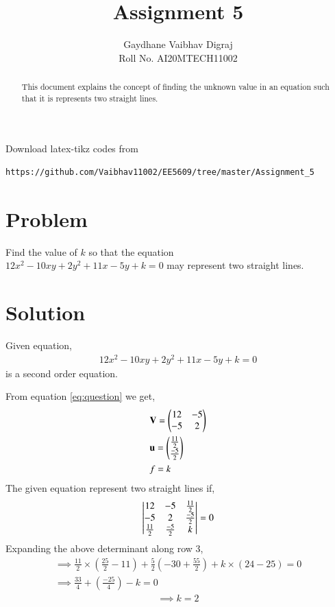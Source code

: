 \documentclass[journal,12pt,twocolumn]{IEEEtran}
\begin{document}
     \def\rightbox#1{\makebox[0in][r]{#1}}
     \def\centbox#1{\makebox[0in]{#1}}
     \def\topbox#1{\raisebox{-\baselineskip}[0in][0in]{#1}}
     \def\midbox#1{\raisebox{-0.5\baselineskip}[0in][0in]{#1}}
\vspace{3cm}
\title{Assignment 5}
\author{Gaydhane Vaibhav Digraj \\ Roll No. AI20MTECH11002}
\maketitle
\newpage
\bigskip
\renewcommand{\thefigure}{\theenumi}
\renewcommand{\thetable}{\theenumi}
\begin{abstract}
This document explains the concept of finding the unknown value in an equation such that it is represents two straight lines.
\end{abstract}
%
Download latex-tikz codes from 
%
\begin{lstlisting}
https://github.com/Vaibhav11002/EE5609/tree/master/Assignment_5
\end{lstlisting}
%
\section{Problem}
Find the value of $k$ so that the equation \\$12x^2-10xy+2y^2+11x-5y+k=0$ may represent two straight lines.

\section{Solution}
Given equation,
\begin{align}
12x^2-10xy+2y^2+11x-5y+k =0 \label{eq:question}
\end{align}
is a second order equation.

From equation \eqref{eq:question} we get, 
\begin{align}
    &\mathbf{V}=\begin{pmatrix}12 & -5 \\ -5 & 2\end{pmatrix} \label{eq:eq1}\\ 
    &\mathbf{u}=\begin{pmatrix}\frac{11}{2} \\ \frac{-5}{2}\end{pmatrix} \label{eq:eq2}\\
    & f=k \label{eq:eq3}
\end{align}
The given equation represent two straight lines if, 
\begin{align}
    \begin{vmatrix}12 & -5 & \frac{11}{2} \\ -5 & 2 & \frac{-5}{2}\\\frac{11}{2} & \frac{-5}{2} & k\end{vmatrix} = 0 \label{eq:solu_1}
\end{align}
Expanding the above determinant along row 3, 
\begin{multline}
    \implies \frac{11}{2}\times(\frac{25}{2}-11) + \frac{5}{2}(-30 + \frac{55}{2}) + k\times(24-25) = 0 \\
\implies \frac{33}{4} + (\frac{-25}{4}) - k = 0 
\end{multline}
\begin{align}
    \implies \boxed{k=2} \label{eq:result}
\end{align}
\end{document}
